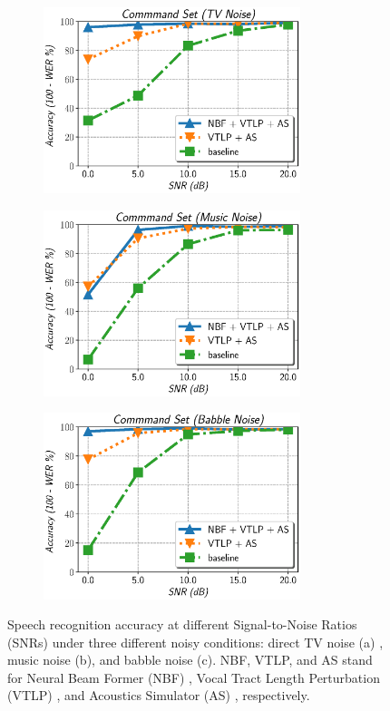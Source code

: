 \documentclass{article}
\begin{document}
\begin{figure}
  \captionsetup[subfigure]{justification=centering}
    \centering
    \begin{subfigure}[5]{0.5\textwidth}
      {\includegraphics[width=75mm]{../figures/plot_farfield_wer_tv}}
      \caption{
          \label{fig:tv_noise}
      }
    \end{subfigure}

    \begin{subfigure}[b]{0.5\textwidth} 
      {\includegraphics[width=75mm]{../figures/plot_farfield_wer_music}}

    \caption{
          \label{fig:music_noise}
    }
    \end{subfigure}

    \begin{subfigure}[b]{0.5\textwidth} 
      {\includegraphics[width=75mm]{../figures/plot_farfield_wer_babble}}
    \caption{
          \label{fig:babble_noise}
    }
    \end{subfigure}

 \caption{\label{fig:plot_farfield_wer}
  Speech recognition accuracy at different Signal-to-Noise Ratios (SNRs)
  under three different noisy conditions: direct TV noise (a)
  , music noise (b), and babble noise (c). NBF, VTLP, and AS
  stand for Neural Beam Former (NBF) \cite{j_heymann_icassp_2016_00}, 
  Vocal Tract Length Perturbation (VTLP) \cite{c_kim_interspeech_2019_00} , and
  Acoustics Simulator (AS) \cite{c_kim_interspeech_2017_00,
  c_kim_interspeech_2018_00},
  respectively.
  \vspace{-2mm}
 }
\end{figure}
\end{document}
